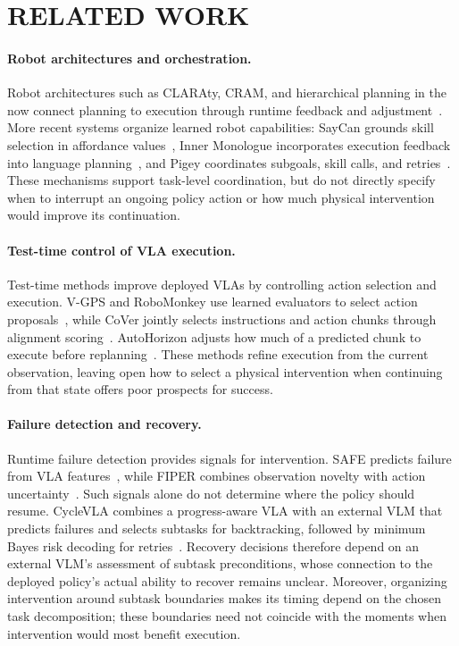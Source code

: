 \section{RELATED WORK}

\paragraph{Robot architectures and orchestration.}
Robot architectures such as CLARAty, CRAM, and hierarchical planning in the now connect planning to execution through runtime feedback and adjustment~\citep{volpe2001claraty,beetz2010cram,kaelbling2011now}. More recent systems organize learned robot capabilities: SayCan grounds skill selection in affordance values~\citep{ichter2023saycan}, Inner Monologue incorporates execution feedback into language planning~\citep{huang2023innermonologue}, and Pigey coordinates subgoals, skill calls, and retries~\citep{galanti2026pigey}. These mechanisms support task-level coordination, but do not directly specify when to interrupt an ongoing policy action or how much physical intervention would improve its continuation.

\paragraph{Test-time control of VLA execution.}
Test-time methods improve deployed VLAs by controlling action selection and execution. V-GPS and RoboMonkey use learned evaluators to select action proposals~\citep{nakamoto2025steering,kwok2025robomonkey}, while CoVer jointly selects instructions and action chunks through alignment scoring~\citep{kwok2026cover}. AutoHorizon adjusts how much of a predicted chunk to execute before replanning~\citep{wang2026autohorizon}. These methods refine execution from the current observation, leaving open how to select a physical intervention when continuing from that state offers poor prospects for success.

\paragraph{Failure detection and recovery.}
Runtime failure detection provides signals for intervention. SAFE predicts failure from VLA features~\citep{gu2025safe}, while FIPER combines observation novelty with action uncertainty~\citep{romer2025fiper}. Such signals alone do not determine where the policy should resume. CycleVLA combines a progress-aware VLA with an external VLM that predicts failures and selects subtasks for backtracking, followed by minimum Bayes risk decoding for retries~\citep{ma2026cyclevla}. Recovery decisions therefore depend on an external VLM's assessment of subtask preconditions, whose connection to the deployed policy's actual ability to recover remains unclear. Moreover, organizing intervention around subtask boundaries makes its timing depend on the chosen task decomposition; these boundaries need not coincide with the moments when intervention would most benefit execution.
